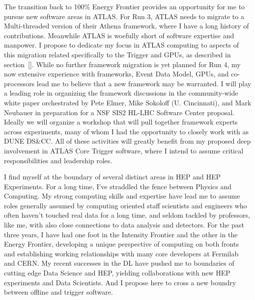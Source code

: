
The transition back to 100\% Energy Frontier provides an opportunity
for me to pursue new software areas in ATLAS. For Run 3, ATLAS needs
to migrate to a Multi-threaded version of their Athena framework,
where I have a long history of contributions. Meanwhile ATLAS is
woefully short of software expertise and manpower. I propose to
dedicate my focus in ATLAS computing to aspects of this migration
related specifically to the Trigger and GPUs, as described in
section~\ref{}. While no further framework migration is yet planned
for Run 4, my now extensive experience with frameworks, Event Data
Model, GPUs, and co-processors lead me to believe that a new framework
may be warranted.  I will play a leading role in organizing the
framework discussions in the community-wide white paper orchestrated
by Pete Elmer, Mike Sokoloff (U. Cincinnati), and Mark Neubauer in
preparation for a NSF SIS2 HL-LHC Software Center proposal. Ideally we
will organize a workshop that will pull together framework experts
across experiments, many of whom I had the opportunity to closely work
with as DUNE DS\&CC. All of these activities will greatly benefit from
my proposed deep involvement in ATLAS Core Trigger software, where I
intend to assume critical responsibilities and leadership roles.

%

I find myself at the boundary of several distinct areas in HEP and HEP
Experiments. For a long time, I've straddled the fence between Physics
and Computing.  My strong computing skills and expertise have lead me
to assume roles generally assumed by computing oriented staff
scientists and engineers who often haven't touched real data for a
long time, and seldom tackled by professors, like me, with also close
connections to data analysis and detectors.  For the past three years,
I have had one foot in the Intensity Frontier and the other in the
Energy Frontier, developing a unique perspective of computing on both
fronts and establishing working relationships with many core
developers at Fermilab and CERN. My recent successes in the DL have
pushed me to boundaries of cutting edge Data Science and HEP, yielding
collaborations with new HEP experiments and Data Scientists. And I
propose here to cross a new boundry between offline and trigger
software. 

